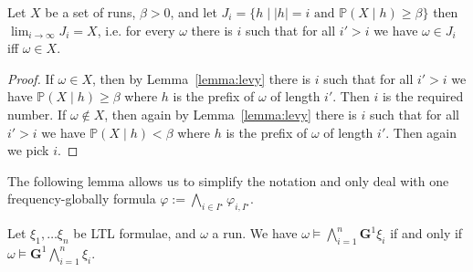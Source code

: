 \documentclass[a4paper,UKenglish]{lipics}
\newcommand{\Gf}[1]{\mathbf{G}^{#1}}
\newcommand{\fix}[1]{{#1^\star}}
\newcommand{\fixI}{\fix{I}}
\begin{document}
\begin{lemma}\label{lemma:prefix-approximate}
Let $X$ be a set of runs, $\beta > 0$, and let $J_i = \{h \mid \text{$|h|=i$ and $\mathbb{P}(X \mid h) \ge \beta$}\}$ then
$\lim_{i\to\infty} J_i = X$, i.e. for every $\omega$ there is $i$ such that
for all $i' > i$ we have $\omega\in J_i$ iff $\omega\in X$.
\end{lemma}
\begin{proof}
If $\omega\in X$, then by Lemma~\ref{lemma:levy} there is $i$ such that for all $i'>i$ we have
$\mathbb{P}(X\mid h) \ge \beta$ where $h$ is the prefix of $\omega$ of length $i'$. Then $i$ is the required number.
If $\omega\not\in X$, then again by Lemma~\ref{lemma:levy} there is $i$ such that for all $i'>i$ we have
$\mathbb{P}(X\mid h) < \beta$ where $h$ is the prefix of $\omega$ of length $i'$. Then again we pick $i$.
\end{proof}

The following lemma allows us to simplify the notation and only deal with one frequency-globally formula $\varphi := \bigwedge_{i\in\fixI} \varphi_{i,\fixI}$.
\begin{lemma}\label{lemma:one-formula}
	Let $\xi_1,\ldots \xi_n$ be LTL formulae, and $\omega$ a run. We have
	$\omega\models \bigwedge_{i=1}^n \Gf{1} \xi_i$
	if and only if
	$\omega\models \Gf{1}\bigwedge_{i=1}^n  \xi_i$.
\end{lemma}
\end{document}
